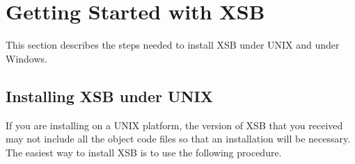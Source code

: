 \chapter{Getting Started with XSB} \label{quick_start}

This section describes the steps needed to install XSB under UNIX and
under Windows.

\section{Installing XSB under UNIX}
\label{installation_options}

If you are installing on a UNIX platform, the version of XSB that you
received may not include all the object code files so that an
installation will be necessary.  The easiest way to install XSB is to
use the following procedure.


